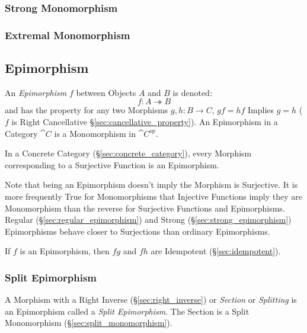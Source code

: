 \subsubsection{Strong Monomorphism}\label{sec:strong_monomorphism}

\subsubsection{Extremal Monomorphism}\label{sec:extremal_monomorphism}



\subsection{Epimorphism}\label{sec:epimorphism}

An \emph{Epimorphism} $f$ between Objects $A$ and $B$ is denoted:
\[
  f : A \twoheadrightarrow B
\]
and has the property for any two Morphisms $g, h : B \rightarrow C$,
$gf = hf$ Implies $g = h$ ($f$ is Right Cancellative
\S\ref{sec:cancellative_property}). An Epimorphism in a Category
$\cat{C}$ is a Monomorphism in $\cat{C^{op}}$.

In a Concrete Category (\S\ref{sec:concrete_category}), every Morphism
corresponding to a Surjective Function is an Epimorphism.

\HandRight\; Note that being an Epimorphism doesn't imply the Morphism
is Surjective. It is more frequently True for Monomorphisms that
Injective Functions imply they are Monomorphism than the reverse for
Surjective Functions and Epimorphisms. Regular
(\S\ref{sec:regular_epimorphism}) and Strong
(\S\ref{sec:strong_epimorphism}) Epimorphisms behave closer to
Surjections than ordinary Epimorphisms.

If $f$ is an Epimorphism, then $fg$ and $fh$ are Idempotent
(\S\ref{sec:idempotent}). %



\subsubsection{Split Epimorphism}\label{sec:split_epimorphism}

A Morphism with a Right Inverse (\S\ref{sec:right_inverse}) or
\emph{Section} or \emph{Splitting} is an Epimorphism called a
\emph{Split Epimorphism}. The Section is a Split Monomorphism
(\S\ref{sec:split_monomorphism}).

